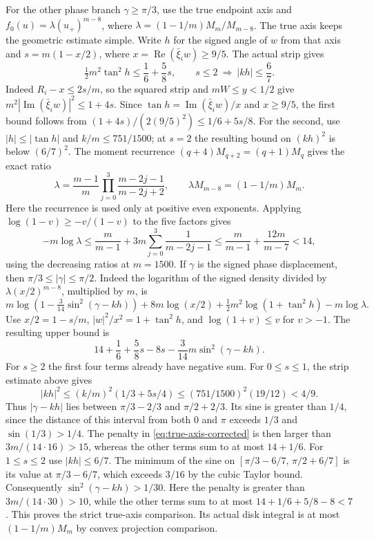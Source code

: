 \documentclass[11pt]{article}
\begin{document}
	For the other phase branch $\gamma\geq\pi/3$, use the true endpoint
	axis and $f_0(u)=\lambda(u_+)^{m-8}$, where
	$\lambda=(1-1/m)M_m/M_{m-8}$.
	The true axis keeps the geometric estimate simple.  Write $h$ for
	the signed angle of $w$ from that axis and $s=m(1-x/2)$, where
	$x=\operatorname{Re}(\bar\xi_iw)\geq9/5$.  The actual strip gives
	\[
	\tfrac12m^2\tan^2 h\leq\frac16+\frac58s,
	\qquad s\leq2\ \Longrightarrow\ |kh|\leq\frac67.
	\]
	Indeed $R_i-x\leq2s/m$, so the squared strip and $mW\leq y<1/2$
	give $m^2|\operatorname{Im}(\bar\xi_iw)|^2\leq 1+4s$.
	Since $\tan h=\operatorname{Im}(\bar\xi_iw)/x$ and $x\geq9/5$,
	the first bound follows from $(1+4s)/(2(9/5)^2)\leq1/6+5s/8$.
	For the second, use $|h|\leq|\tan h|$ and $k/m\leq751/1500$;
	at $s=2$ the resulting bound on $(kh)^2$ is below $(6/7)^2$.
	The moment recurrence $(q+4)M_{q+2}=(q+1)M_q$ gives the exact ratio
	\[
	\lambda=\frac{m-1}{m}\prod_{j=0}^3
	\frac{m-2j-1}{m-2j+2},\qquad
	\lambda M_{m-8}=(1-1/m)M_m.
	\]
	Here the recurrence is used only at positive even exponents.
	Applying $\log(1-v)\geq-v/(1-v)$ to the five factors gives
	\[
	-m\log\lambda\leq\frac{m}{m-1}+3m\sum_{j=0}^3\frac1{m-2j-1}
	\leq\frac{m}{m-1}+\frac{12m}{m-7}<14,
	\]
	using the decreasing ratios at $m=1500$.  If $\gamma$ is the
	signed phase displacement, then $\pi/3\leq|\gamma|\leq\pi/2$.
	Indeed the logarithm of the signed density divided by
	$\lambda(x/2)^{m-8}$, multiplied by $m$, is
	\[
	m\log\!\left(1-\tfrac3{14}\sin^2(\gamma-kh)\right)
	+8m\log(x/2)+\tfrac12m^2\log(1+\tan^2 h)-m\log\lambda .
	\]
	Use $x/2=1-s/m$, $|w|^2/x^2=1+\tan^2h$, and $\log(1+v)\leq v$
	for $v>-1$. The resulting upper bound is
	\begin{equation}\label{eq:true-axis-corrected}
		14+\frac16+\frac58s-8s-
		\frac3{14}m\sin^2(\gamma-kh).
	\end{equation}
	For $s\geq2$ the first four terms already have negative sum.
	For $0\leq s\leq1$, the strip estimate above gives
	\[
	|kh|^2\leq (k/m)^2(1/3+5s/4)
	\leq (751/1500)^2(19/12)<4/9 .
	\]
	Thus $|\gamma-kh|$ lies between $\pi/3-2/3$ and $\pi/2+2/3$.
	Its sine is greater than $1/4$, since the distance of this interval
	from both $0$ and $\pi$ exceeds $1/3$ and $\sin(1/3)>1/4$.
	The penalty in \eqref{eq:true-axis-corrected} is then larger than
	$3m/(14\cdot16)>15$, whereas the other terms sum to at most $14+1/6$.
	For $1\leq s\leq2$ use $|kh|\leq6/7$.
	The minimum of the sine on $[\pi/3-6/7,\,\pi/2+6/7]$ is its
	value at $\pi/3-6/7$, which exceeds $3/16$ by the cubic Taylor
	bound. Consequently $\sin^2(\gamma-kh)>1/30$.
	Here the penalty is greater than $3m/(14\cdot30)>10$,
	while the other terms sum to at most $14+1/6+5/8-8<7$.
	This proves the strict true-axis comparison.  Its actual disk
	integral is at most $(1-1/m)M_m$ by convex projection comparison.
	
\end{document}

